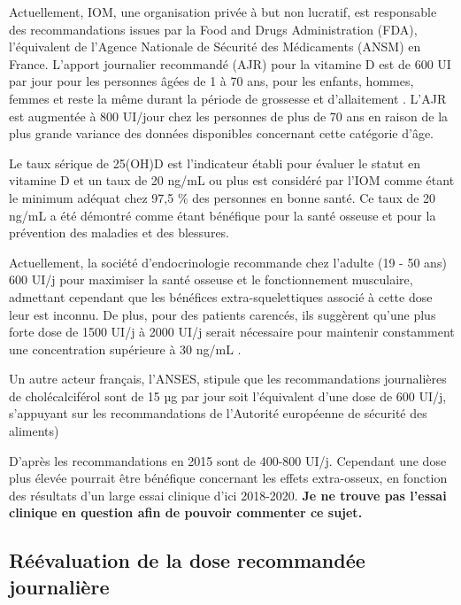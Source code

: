 \documentclass[
  a4paper,
  DIV=11,
  numbers=noendperiod,
  listof=totoc]{scrreprt}
\begin{document}
Actuellement, \ac{IOM}, une organisation privée à but non lucratif, est
responsable des recommandations issues par la Food and Drugs
Administration (FDA), l'équivalent de l'Agence Nationale de Sécurité des
Médicaments (ANSM) en France. L'apport journalier recommandé (AJR) pour
la vitamine D est de 600 UI par jour pour les personnes âgées de 1 à 70
ans, pour les enfants, hommes, femmes et reste la même durant la période
de grossesse et d'allaitement \autocite[pp.~9]{IOM.2011.org}. L'AJR est
augmentée à 800 UI/jour chez les personnes de plus de 70 ans en raison
de la plus grande variance des données disponibles concernant cette
catégorie d'âge.

Le taux sérique de 25(OH)D est l'indicateur établi pour évaluer le
statut en vitamine D et un taux de 20 ng/mL ou plus est considéré par
l'IOM comme étant le minimum adéquat chez 97,5 \% des personnes en bonne
santé. Ce taux de 20 ng/mL a été démontré comme étant bénéfique pour la
santé osseuse et pour la prévention des maladies et des blessures.

Actuellement, la société d'endocrinologie recommande chez l'adulte (19 -
50 ans) 600 UI/j pour maximiser la santé osseuse et le fonctionnement
musculaire, admettant cependant que les bénéfices extra-squelettiques
associé à cette dose leur est inconnu. De plus, pour des patients
carencés, ils suggèrent qu'une plus forte dose de 1500 UI/j à 2000 UI/j
serait nécessaire pour maintenir constamment une concentration
supérieure à 30 ng/mL \autocite{Holick.2011}.

Un autre acteur français, l'ANSES, stipule que les recommandations
journalières de cholécalciférol sont de 15 µg par jour soit l'équivalent
d'une dose de 600 UI/j, s'appuyant sur les recommandations de l'Autorité
européenne de sécurité des aliments) \autocite{ANSES.2022}

D'après \textcite{Carmeliet.2015} les recommandations en 2015 sont de
400-800 UI/j. Cependant une dose plus élevée pourrait être bénéfique
concernant les effets extra-osseux, en fonction des résultats d'un large
essai clinique d'ici 2018-2020. \textbf{Je ne trouve pas l'essai
clinique en question afin de pouvoir commenter ce sujet.}

\hypertarget{ruxe9uxe9valuation-de-la-dose-recommanduxe9e-journaliuxe8re}{%
\subsection{Réévaluation de la dose recommandée
journalière}\label{ruxe9uxe9valuation-de-la-dose-recommanduxe9e-journaliuxe8re}}
\end{document}
